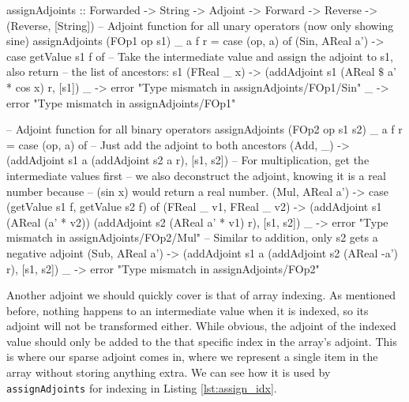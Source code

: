        \begin{haskell}[caption={Defining \texttt{assignAdjoints} for sine, addition, subtraction, and multiplication.}, label=lst:assign_simple, gobble=12]
            assignAdjoints :: Forwarded -> String -> Adjoint -> Forward -> Reverse
                -> (Reverse, [String])
            -- Adjoint function for all unary operators (now only showing sine)
            assignAdjoints (FOp1 op s1) _ a f r = case (op, a) of
                (Sin, AReal a') -> case getValue s1 f of
                    -- Take the intermediate value and assign the adjoint to s1, also return
                    -- the list of ancestors: s1
                    (FReal _ x) -> (addAdjoint s1 (AReal $\$$ a' * cos x) r, [s1])
                    _           -> error "Type mismatch in assignAdjoints/FOp1/Sin"
                _               -> error "Type mismatch in assignAdjoints/FOp1"
            
            -- Adjoint function for all binary operators
            assignAdjoints (FOp2 op s1 s2) _ a f r = case (op, a) of
                -- Just add the adjoint to both ancestors
                (Add, _)        -> (addAdjoint s1 a (addAdjoint s2 a r), [s1, s2])
                -- For multiplication, get the intermediate values first
                -- we also deconstruct the adjoint, knowing it is a real number because
                -- (sin x) would return a real number.
                (Mul, AReal a') -> case (getValue s1 f, getValue s2 f) of
                    (FReal _ v1, FReal _ v2) ->
                        (addAdjoint s1 (AReal (a' * v2)) (addAdjoint s2 (AReal a' * v1) r), 
                        [s1, s2])
                    _                        ->
                        error "Type mismatch in assignAdjoints/FOp2/Mul"
                -- Similar to addition, only s2 gets a negative adjoint
                (Sub, AReal a') -> (addAdjoint s1 a (addAdjoint s2 (AReal -a') r), [s1, s2])
                _               -> error "Type mismatch in assignAdjoints/FOp2"
        \end{haskell}

        Another adjoint we should quickly cover is that of array indexing.
        As mentioned before, nothing happens to an intermediate value when it is indexed, so its adjoint will not be transformed either.
        While obvious, the adjoint of the indexed value should only be added to the that specific index in the array's adjoint.
        This is where our sparse adjoint comes in, where we represent a single item in the array without storing anything extra.
        We can see how it is used by \texttt{assignAdjoints} for indexing in Listing \ref{lst:assign_idx}.


